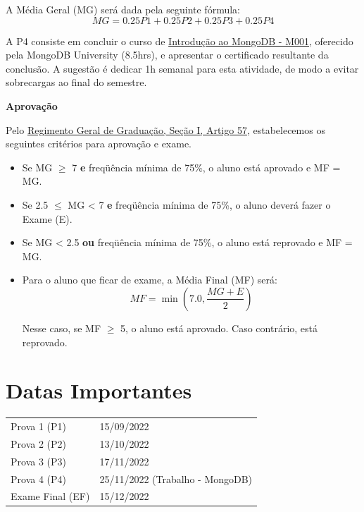 \documentclass[paper=letter, fontsize=12pt]{scrartcl} %
\begin{document}
\vspace{10pt}

A Média Geral (MG) será dada pela seguinte fórmula:
\[MG = 0.25 P1 + 0.25 P2 + 0.25 P3 + 0.25 P4\]

A P4 consiste em concluir o curso de \href{https://university.mongodb.com/courses/M001/about}{Introdução ao MongoDB - M001}, oferecido pela MongoDB
University (8.5hrs), e apresentar o certificado resultante da conclusão. A sugestão é dedicar 1h semanal para esta atividade, de modo a evitar sobrecargas ao final do semestre.

\newpage

\textbf{Aprovação}

Pelo \href{https://www.dac.unicamp.br/portal/graduacao/regimento-geral}{{\color{blue} Regimento Geral de Graduação, Seção I, Artigo 57}}, estabelecemos os seguintes critérios para aprovação e exame.

\begin{itemize}
\item Se MG $\geq$ 7 \textbf{e} freqüência mínima de 75\%, o aluno está aprovado e MF = MG.

\item Se 2.5 $\leq$ MG < 7 \textbf{e} freqüência mínima de 75\%, o aluno deverá fazer o Exame (E).

\item Se MG < 2.5 \textbf{ou} freqüência mínima de 75\%, o aluno está reprovado e MF = MG.

\item Para o aluno que ficar de exame, a Média Final (MF) será:
$$MF = \min\left(7.0, \frac{MG + E}{2}\right)$$

Nesse caso, se MF $\geq$ 5, o aluno está aprovado. Caso contrário, está reprovado.


\end{itemize}

\section{Datas Importantes}

\begin{tabular}{ll}
Prova 1 (P1) & 15/09/2022 \\
Prova 2 (P2) & 13/10/2022 \\
Prova 3 (P3) & 17/11/2022 \\
Prova 4 (P4) & 25/11/2022 (Trabalho - MongoDB) \\
Exame Final (EF) & 15/12/2022 \\
\end{tabular}
\end{document}
